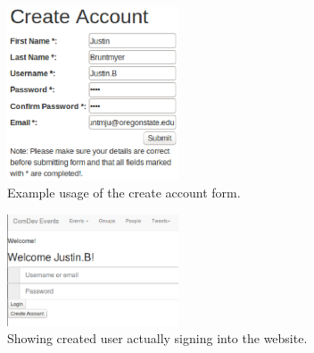 \documentclass[letterpaper,10pt,onecolumn]{IEEEtran} %
\begin{document}
\begin{enumerate}[label*=\arabic*.]
\end{enumerate}

\begin{figure}[htp]
  \begin{center}
  
  \includegraphics[width=2in]{createAccountForm}
  \centering
  \caption{Example usage of the create account form. }

  \end{center}
\end{figure}

\begin{figure}[htp]
  \begin{center}
  
  \includegraphics[width=2in]{loginSuccess}
  \centering
  \caption{Showing created user actually signing into the website. }

  \end{center}
\end{figure}
\end{document}
